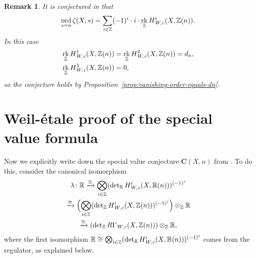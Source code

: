 \documentclass{article}
\DeclareMathOperator{\ord}{ord}
\DeclareMathOperator{\rk}{rk}
\newcommand{\RR}{\mathbb{R}}
\newcommand{\ZZ}{\mathbb{Z}}
\renewcommand{\det}{\operatorname{det}}
\newcommand{\Wc}{\text{\it W,c}}
\theoremstyle{myplain}
\theoremstyle{mydefinition}
\newtheorem{remark}[theorem]{Remark}
\begin{document}
\begin{remark}
  It is conjectured in \cite[\S 3]{Beshenov-Weil-etale-2} that
  \[ \ord_{s = n} \zeta (X,s) =
    \sum_{i\in \ZZ} (-1)^i\cdot i\cdot\rk_\ZZ H^i_\Wc (X,\ZZ(n)). \]
  In this case
  \begin{align*}
    \rk_\ZZ H^1_\Wc (X,\ZZ(n)) & = \rk_\ZZ H^2_\Wc (X,\ZZ(n)) = d_n, \\
    \rk_\ZZ H^3_\Wc (X,\ZZ(n)) & = 0,
  \end{align*}
  so the conjecture holds by Proposition~\ref{prop:vanishing-order-equals-dn}.
\end{remark}


\section{Weil-\'{e}tale proof of the special value formula}
\label{sec:Weil-etale-proof}

Now we explicitly write down the special value conjecture $\mathbf{C} (X,n)$
from \cite[\S 4]{Beshenov-Weil-etale-2}. To do this, consider the canonical
isomorphism
\begin{multline*}
  \lambda\colon \RR \xrightarrow{\cong}
  \bigotimes_{i\in \ZZ} (\det_\RR H^i_\Wc (X, \RR (n)))^{(-1)^i} \\
  \xrightarrow{\cong} \Bigl(\bigotimes_{i\in \ZZ} (\det_\ZZ H^i_\Wc (X, \ZZ (n)))^{(-1)^i}\Bigr) \otimes_\ZZ \RR \\
  \xrightarrow{\cong} (\det_\ZZ R\Gamma_\Wc (X, \ZZ (n))) \otimes_\ZZ \RR,
\end{multline*}
where the first isomorphism
$\RR \cong \bigotimes_{i\in \ZZ} (\det_\RR H^i_\Wc (X, \RR (n)))^{(-1)^i}$
comes from the regulator, as explained below.

\vspace{1em}
\end{document}
